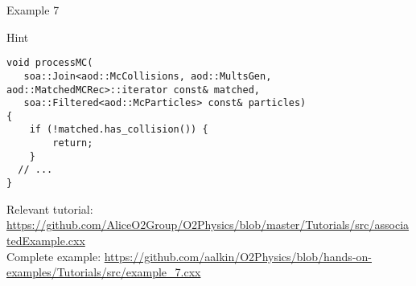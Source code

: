 \documentclass[10pt,lualatex,xcolor={table,svgnames},{hyperref={bookmarks=true,linktoc=all}},aspectratio=169]{beamer}
\begin{document}
\begin{frame}{Example 7}
\begin{block}{Hint}
\begin{verbatim}
void processMC(
   soa::Join<aod::McCollisions, aod::MultsGen, aod::MatchedMCRec>::iterator const& matched,
   soa::Filtered<aod::McParticles> const& particles)
{
    if (!matched.has_collision()) {
        return;
    }
  // ...
}
\end{verbatim}
\end{block}

{\footnotesize Relevant tutorial:  \href{https://github.com/AliceO2Group/O2Physics/blob/master/Tutorials/src/associatedExample.cxx}{https://github.com/AliceO2Group/O2Physics/blob/master/Tutorials/src/associatedExample.cxx} \\
    Complete example: \href{https://github.com/aalkin/O2Physics/blob/hands-on-examples/Tutorials/src/example_7.cxx}{https://github.com/aalkin/O2Physics/blob/hands-on-examples/Tutorials/src/example\_7.cxx}
}
\end{frame}
\end{document}

